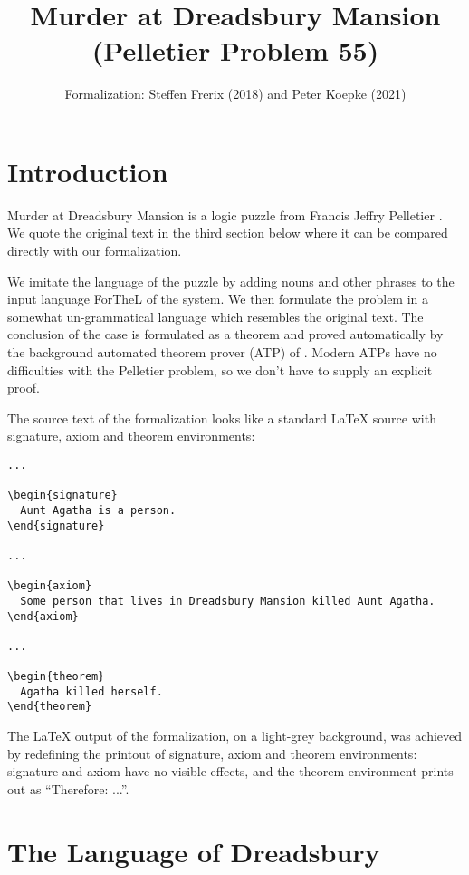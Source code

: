 \documentclass{article}
\title{Murder at Dreadsbury Mansion (Pelletier Problem 55)}
\author{\Naproche Formalization: Steffen Frerix (2018) and Peter Koepke (2021)}
\date{}
\begin{document}
\maketitle

\section{Introduction}

Murder at Dreadsbury Mansion is a logic puzzle from Francis Jeffry Pelletier \cite{Pelletier1986}.
We quote the original text in the third section below where it can be compared directly with our formalization.

We imitate the language of the puzzle by adding nouns and other phrases to the input language ForTheL of the \Naproche system.
We then formulate the problem in a somewhat un-grammatical language which resembles the original text.
The conclusion of the case is formulated as a theorem and proved automatically by the background automated theorem prover (ATP) of \Naproche.
Modern ATPs have no difficulties with the Pelletier problem, so we don't
have to supply an explicit proof.

The source text of the formalization looks like a standard \LaTeX{} source
with signature, axiom and theorem environments:

\begin{verbatim}
...

\begin{signature}
  Aunt Agatha is a person.
\end{signature}

...

\begin{axiom}
  Some person that lives in Dreadsbury Mansion killed Aunt Agatha.
\end{axiom}

...

\begin{theorem}
  Agatha killed herself.
\end{theorem}
\end{verbatim}

The \LaTeX{} output of the formalization, on a light-grey background, was
achieved by redefining the printout of signature, axiom and theorem environments: signature and axiom have no visible effects, and the theorem environment prints out as ``Therefore: ...''.


\section{The Language of Dreadsbury}
\end{document}

